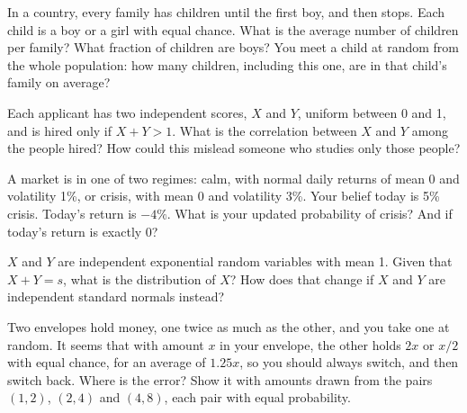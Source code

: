 \begin{question}\label{iq:iv1:conditional-probability-and-bayes:30}
In a country, every family has children until the first boy, and then stops. Each child is a boy or a girl with equal chance. What is the average number of children per family? What fraction of children are boys? You meet a child at random from the whole population: how many children, including this one, are in that child's family on average?
\end{question}

\begin{question}\label{iq:iv1:conditional-probability-and-bayes:31}
Each applicant has two independent scores, $X$ and $Y$, uniform between 0 and 1, and is hired only if $X + Y > 1$. What is the correlation between $X$ and $Y$ among the people hired? How could this mislead someone who studies only those people?
\end{question}

\begin{question}\label{iq:iv1:conditional-probability-and-bayes:32}
A market is in one of two regimes: calm, with normal daily returns of mean 0 and volatility 1\%, or crisis, with mean 0 and volatility 3\%. Your belief today is 5\% crisis. Today's return is $-4\%$. What is your updated probability of crisis? And if today's return is exactly 0?
\end{question}

\begin{question}\label{iq:iv1:conditional-probability-and-bayes:33}
$X$ and $Y$ are independent exponential random variables with mean 1. Given that $X + Y = s$, what is the distribution of $X$? How does that change if $X$ and $Y$ are independent standard normals instead?
\end{question}

\begin{question}\label{iq:iv1:conditional-probability-and-bayes:34}
Two envelopes hold money, one twice as much as the other, and you take one at random. It seems that with amount $x$ in your envelope, the other holds $2x$ or $x/2$ with equal chance, for an average of $1.25x$, so you should always switch, and then switch back. Where is the error? Show it with amounts drawn from the pairs $(1, 2)$, $(2, 4)$ and $(4, 8)$, each pair with equal probability.
\end{question}

